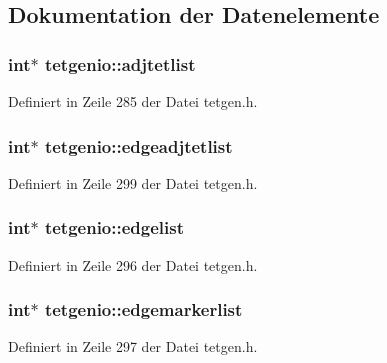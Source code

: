 \subsection{Dokumentation der Datenelemente}
\hypertarget{classtetgenio_a44f7eb61256dfb95d2fa2bdb91ea3718}{
\subsubsection[{adjtetlist}]{\setlength{\rightskip}{0pt plus 5cm}int$\ast$ tetgenio\-::adjtetlist}}\label{classtetgenio_a44f7eb61256dfb95d2fa2bdb91ea3718}


Definiert in Zeile 285 der Datei tetgen.\-h.

\hypertarget{classtetgenio_ac1b0d2422e6da1fb08246f61e39bb352}{
\subsubsection[{edgeadjtetlist}]{\setlength{\rightskip}{0pt plus 5cm}int$\ast$ tetgenio\-::edgeadjtetlist}}\label{classtetgenio_ac1b0d2422e6da1fb08246f61e39bb352}


Definiert in Zeile 299 der Datei tetgen.\-h.

\hypertarget{classtetgenio_ad4910159c1aa4dad3e66b24d8816f76c}{
\subsubsection[{edgelist}]{\setlength{\rightskip}{0pt plus 5cm}int$\ast$ tetgenio\-::edgelist}}\label{classtetgenio_ad4910159c1aa4dad3e66b24d8816f76c}


Definiert in Zeile 296 der Datei tetgen.\-h.

\hypertarget{classtetgenio_a35d12dcf3f3bb8e9304617da0e36d13f}{
\subsubsection[{edgemarkerlist}]{\setlength{\rightskip}{0pt plus 5cm}int$\ast$ tetgenio\-::edgemarkerlist}}\label{classtetgenio_a35d12dcf3f3bb8e9304617da0e36d13f}


Definiert in Zeile 297 der Datei tetgen.\-h.

